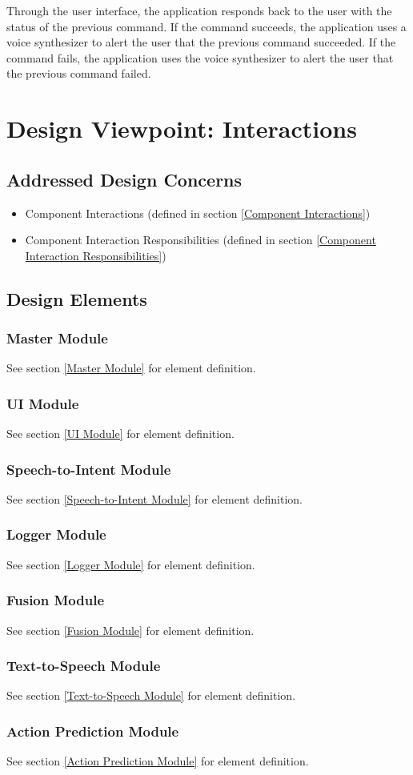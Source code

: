 \documentclass[onecolumn, draftclsnofoot,10pt, compsoc]{IEEEtran}
\newcommand{\designConcernRef}[1]{
    #1 (defined in section \ref{#1})
}
\newcommand{\designElementRef}[1]{
    \subsubsection{#1}
        See section \ref{#1} for element definition.
}
\begin{document}
        Through the user interface, the application responds back to the user with the status of the previous command.
        If the command succeeds, the application uses a voice synthesizer to alert the user that the previous command succeeded.
        If the command fails, the application uses the voice synthesizer to alert the user that the previous command failed.

\section{Design Viewpoint: Interactions}
    \subsection{Addressed Design Concerns}
        \begin{itemize}
            \item \designConcernRef{Component Interactions}
            \item \designConcernRef{Component Interaction Responsibilities}
        \end{itemize}

    \subsection{Design Elements}
        \designElementRef{Master Module}
        \designElementRef{UI Module}
        \designElementRef{Speech-to-Intent Module}
        \designElementRef{Logger Module}
        \designElementRef{Fusion Module}
        \designElementRef{Text-to-Speech Module}
        \designElementRef{Action Prediction Module}
\end{document}
